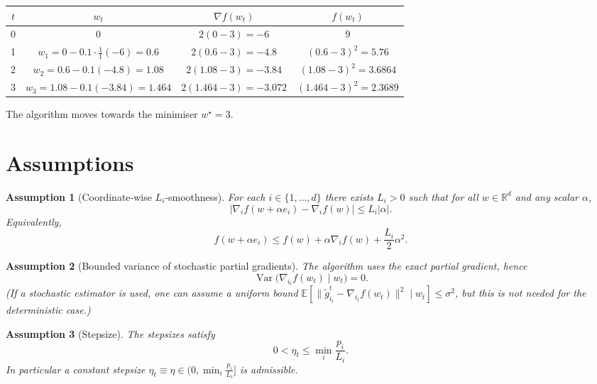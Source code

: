 \documentclass{article}
\newcommand{\E}{\mathbb{E}}
\newcommand{\R}{\mathbb{R}}
\newtheorem{assumption}{Assumption}
\begin{document}
\begin{center}
\begin{tabular}{c|c|c|c}
$t$ & $w_{t}$ & $\nabla f(w_{t})$ & $f(w_{t})$\\\hline
0 & $0$ & $2(0-3)=-6$ & $9$\\
1 & $w_{1}=0-0.1\cdot\frac{1}{1}(-6)=0.6$ &
$2(0.6-3)=-4.8$ & $(0.6-3)^{2}=5.76$\\
2 & $w_{2}=0.6-0.1(-4.8)=1.08$ &
$2(1.08-3)=-3.84$ & $(1.08-3)^{2}=3.6864$\\
3 & $w_{3}=1.08-0.1(-3.84)=1.464$ &
$2(1.464-3)=-3.072$ & $(1.464-3)^{2}=2.3689$
\end{tabular}
\end{center}
The algorithm moves towards the minimiser $w^{\star}=3$.

\newpage

\section*{Assumptions}
\begin{assumption}[Coordinate‑wise $L_{i}$‑smoothness]\label{ass:smooth}
For each $i\in\{1,\dots,d\}$ there exists $L_{i}>0$ such that for all $w\in\R^{d}$ and
any scalar $\alpha$,
\[
\bigl| \nabla_{i}f(w+ \alpha e_{i})-\nabla_{i}f(w) \bigr|
\le L_{i}|\alpha|.
\tag{2}
\]
Equivalently,
\[
f(w+ \alpha e_{i})\le f(w)+\alpha\nabla_{i}f(w)+\frac{L_{i}}{2}\alpha^{2}.
\tag{2'}
\]
\end{assumption}

\begin{assumption}[Bounded variance of stochastic partial gradients]\label{ass:var}
The algorithm uses the exact partial gradient, hence
\[
\operatorname{Var}\!\bigl(\nabla_{i_{t}}f(w_{t})\mid w_{t}\bigr)=0 .
\]
(If a stochastic estimator is used, one can assume a uniform bound
$\E[\|\tilde g_{i_{t}}^{t}-\nabla_{i_{t}}f(w_{t})\|^{2}\mid w_{t}]\le\sigma^{2}$,
but this is not needed for the deterministic case.)
\end{assumption}

\begin{assumption}[Stepsize]\label{ass:stepsize}
The stepsizes satisfy
\[
0<\eta_{t}\le \min_{i}\frac{p_{i}}{L_{i}} .
\tag{3}
\]
In particular a constant stepsize
$\eta_{t}\equiv\eta\in\bigl(0,\min_{i}\frac{p_{i}}{L_{i}}\bigr]$ is admissible.
\end{assumption}
\end{document}
